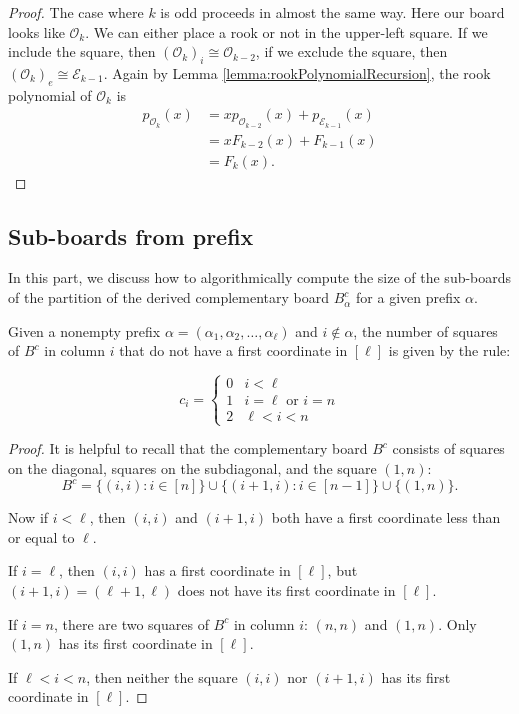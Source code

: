 \begin{proof}
  The case where $k$ is odd proceeds in almost the same way.
  Here our board looks like $\mathcal{O}_{k}$.
  We can either place a rook or not in the upper-left square.
  If we include the square, then $(\mathcal{O}_{k})_i \cong \mathcal{O}_{k-2}$,
  if we exclude the square, then $(\mathcal{O}_{k})_e \cong \mathcal{E}_{k-1}$.
  Again by Lemma \ref{lemma:rookPolynomialRecursion}, the rook polynomial
  of $\mathcal{O}_{k}$ is
  \begin{align}
    p_{\mathcal{O}_{k}}(x)
    &= xp_{\mathcal{O}_{k-2}}(x) + p_{\mathcal{E}_{k-1}}(x) \\
    &= xF_{k-2}(x) + F_{k-1}(x) \\
    &= F_{k}(x).
  \end{align}
\end{proof}

\subsection{Sub-boards from prefix}

In this part, we discuss how to algorithmically compute the size of the
sub-boards of the partition of the derived complementary board $B_\alpha^c$
for a given prefix $\alpha$.

\begin{lemma}
  Given a nonempty prefix $\alpha = (\alpha_1, \alpha_2, \dots, \alpha_\ell)$
  and $i \not\in \alpha$,
  the number of squares of $B^c$ in column $i$ that do not have
  a first coordinate in $[\ell]$
  is given by the rule:
  \begin{singlespace}
  \begin{equation}
    c_i = \begin{cases}
      0 & i < \ell \\
      1 & i = \ell \text{ or } i = n \\
      2 & \ell < i < n
    \end{cases}
  \end{equation}
  \end{singlespace}
\end{lemma}

\begin{proof}
  It is helpful to recall that the complementary board $B^c$ consists of squares
  on the diagonal, squares on the subdiagonal, and the square $(1, n)$:
  \[
    B^c = \{(i, i) : i \in [n]\} \cup \{(i + 1, i) : i \in [n-1]\} \cup \{(1,n)\}.
  \]

  Now if $i < \ell$, then $(i,i)$ and $(i + 1, i)$ both have a first coordinate
  less than or equal to $\ell$.

  If $i = \ell$, then $(i, i)$ has a first coordinate in $[\ell]$, but
  $(i + 1, i) = (\ell + 1, \ell)$ does not have its first coordinate in $[\ell]$.

  If $i = n$, there are two squares of $B^c$ in column $i$: $(n, n)$ and $(1, n)$.
  Only $(1,n)$ has its first coordinate in $[\ell]$.

  If $\ell < i < n$, then neither the square $(i, i)$ nor $(i+1, i)$ has
  its first coordinate in $[\ell]$.
\end{proof}


